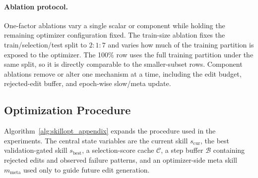 \paragraph{Ablation protocol.}
One-factor ablations vary a single scalar or component while holding the remaining optimizer configuration fixed. The train-size ablation fixes the train/selection/test split to $2{:}1{:}7$ and varies how much of the training partition is exposed to the optimizer. The 100\% row uses the full training partition under the same split, so it is directly comparable to the smaller-subset rows. Component ablations remove or alter one mechanism at a time, including the edit budget, rejected-edit buffer, and epoch-wise slow/meta update.

\subsection{Optimization Procedure}
\label{app:algorithm}

Algorithm~\ref{alg:skillopt_appendix} expands the procedure used in the experiments. The central state variables are the current skill $s_\mathrm{cur}$, the best validation-gated skill $s_\mathrm{best}$, a selection-score cache $\mathcal{C}$, a step buffer $\mathcal{B}$ containing rejected edits and observed failure patterns, and an optimizer-side meta skill $m_\mathrm{meta}$ used only to guide future edit generation.


